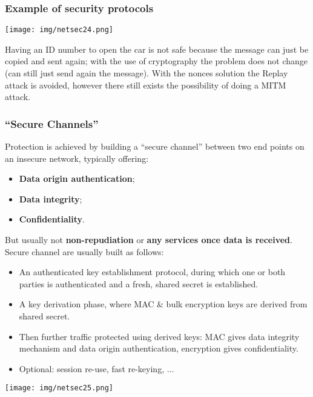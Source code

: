 \documentclass[a4paper, 10pt, titlepage]{article}
\begin{document}
\subsubsection*{Example of security protocols}
\begin{center}
	\texttt{[image: img/netsec24.png]}
\end{center}
Having an ID number to open the car is not safe because the message can just be copied and sent again; with the use of cryptography the problem does not change (can still just send again the message).
With the nonces solution the Replay attack is avoided, however there still exists the possibility of doing a MITM attack.

\subsubsection*{“Secure Channels”}
Protection is achieved by building a “secure channel” between two end points on an insecure network, typically offering:
\begin{itemize}
	\item \textbf{Data origin authentication};
	\item \textbf{Data integrity};
	\item \textbf{Confidentiality}.
\end{itemize}
But usually not \textbf{non-repudiation} or \textbf{any services once data is received}. \medskip\\
Secure channel are usually built as follows:
\begin{itemize}
	\item An authenticated key establishment protocol, during which one or both parties is authenticated and a fresh, shared secret is established.
	\item A key derivation phase, where MAC \& bulk encryption keys are derived from shared secret.
	\item Then further traffic protected using derived keys: MAC gives data integrity mechanism and data origin 	authentication, encryption gives confidentiality.
	\item Optional: session re-use, fast re-keying, ...
\end{itemize}
\begin{center}
	\texttt{[image: img/netsec25.png]}
\end{center}
\end{document}
